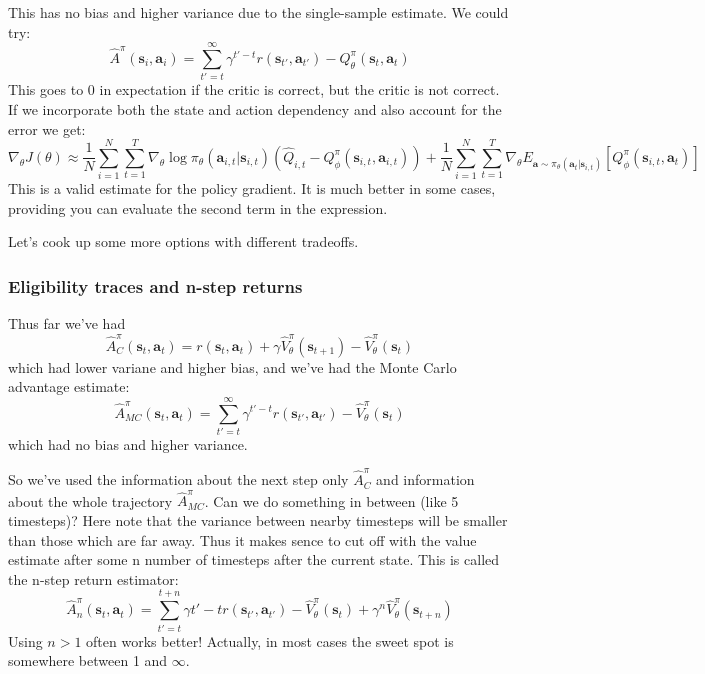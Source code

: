 \documentclass{report}
\begin{document}
This has no bias and higher variance due to the single-sample estimate.
We could  try:
\begin{equation}
		\hat{A}^\pi (\bm{s}_{i}, \bm{a}_{i}) = \sum_{t'=t}^{\infty} \gamma^{t'-t} r(\bm{s}_{t'}, \bm{a}_{t'}) - Q^\pi_\theta(\bm{s}_t, \bm{a}_t)
\end{equation}
This goes to 0 in expectation if the critic is correct, but the critic is not correct.
If we incorporate both the state and action dependency and also account for the error we get:
\begin{equation}
		\nabla_\theta J(\theta) \approx \frac{1}{N} \sum_{i=1}^{N} \sum_{t=1}^{T} \nabla_{\theta} \log \pi_\theta(\bm{a}_{i,t}|\bm{s}_{i,t})
		\left( \hat{Q}_{i,t} - Q^\pi_\phi (\bm{s}_{i,t}, \bm{a}_{i,t})  \right) 
		+ \frac{1}{N} \sum_{i=1}^{N} \sum_{t=1}^{T} \nabla_{\theta}
		E_{\bm{a} \sim \pi_\theta(\bm{a}_t|\bm{s}_{i,t})}
		\left[ Q^\pi_\phi (\bm{s}_{i,t}, \bm{a}_{t}) \right] 
\end{equation}
This is a valid estimate for the policy gradient.
It is much better in some cases, providing you can evaluate the second term in the expression.

Let's cook up some more options with different tradeoffs.

\subsubsection{Eligibility traces and n-step returns}
Thus far we've had
\begin{equation}
\hat{A}^\pi_C (\bm{s}_{t}, \bm{a}_{t}) =
r(\bm{s}_{t}, \bm{a}_{t}) + \gamma \hat{V}^\pi_\theta(\bm{s}_{t+1}) - \hat{V}^\pi_\theta(\bm{s}_t)
\end{equation}
which had lower variane and higher bias,
and we've had the Monte Carlo advantage estimate:
\begin{equation}
		\hat{A}^\pi_{MC} (\bm{s}_{t}, \bm{a}_{t}) =
		\sum_{t'=t}^{\infty}  \gamma^{t'-t} r(\bm{s}_{t'}, \bm{a}_{t'})  - \hat{V}^\pi_\theta(\bm{s}_t)
\end{equation}
which had no bias and higher variance.

So we've used the information about the next step only $\hat{A}^\pi_C$ and information about 
the whole trajectory $\hat{A}^\pi_{MC}$.
Can we do something in between (like 5 timesteps)?
Here note that the variance between nearby timesteps will be smaller than those which are far away.
Thus it makes sence to cut off with the value estimate after some n number of timesteps after the current state.
This is called the n-step return estimator:
\begin{equation}
		\hat{A}^\pi_n (\bm{s}_{t}, \bm{a}_{t}) =
		\sum_{t'=t}^{t+n} \gamma{t'-t} r(\bm{s}_{t'}, \bm{a}_{t'})
		- \hat{V}^\pi_\theta(\bm{s}_t) + \gamma^n \hat{V}^\pi_\theta(\bm{s}_{t+n})
\end{equation}
Using $n>1$ often works better! Actually, in most cases
the sweet spot is somewhere between 1 and $\infty$.
\end{document}
